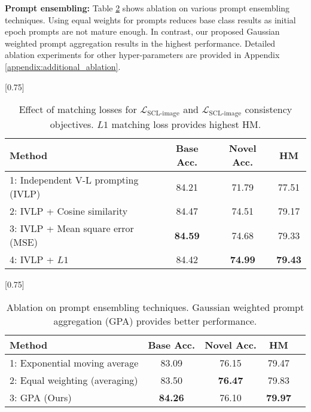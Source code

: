 \documentclass[10pt,twocolumn,letterpaper]{article}
\begin{document}
\noindent \textbf{Prompt ensembling:}
Table \ref{tab:ablations_on_ensembling} shows ablation on various prompt ensembling techniques. Using equal weights for prompts reduces base class results as initial epoch prompts are not mature enough. In contrast, our proposed Gaussian weighted prompt aggregation results in the highest performance. Detailed ablation experiments for other hyper-parameters are provided in Appendix \ref{appendix:additional_ablation}.
\begin{table}[t!]
    \small \centering
 \setlength{\tabcolsep}{7pt}
    \scalebox{0.75}[0.75]{
    \begin{tabular}{lccc}
    \toprule
    Method  & Base Acc. & Novel Acc. & HM \\
    \midrule
    1: Independent V-L prompting (IVLP) & 84.21 & 71.79 & 77.51 \\
    2: IVLP + Cosine similarity & 84.47	&74.51	&79.17 \\
    3: IVLP + Mean square error (MSE)  & \textbf{84.59}&	74.68 &	79.33 \\
     \rowcolor{tabhighlight} 4: IVLP + $L1$  & 84.42 & \textbf{74.99} & \textbf{79.43} \\
    \bottomrule
    \end{tabular}}
    \caption{Effect of matching losses for $\mathcal{L}_\text{SCL-image}$ and $\mathcal{L}_\text{SCL-image}$ consistency objectives. $L1$ matching loss provides highest HM.}
    \label{table:matching_loss_ablations}
\end{table} \begin{table}[t!]
   \small \centering
  \setlength{\tabcolsep}{10pt}
    \scalebox{0.75}[0.75]{
    \begin{tabular}{l cccc}
    \toprule
    Method  & Base Acc. & Novel Acc. & HM\\
            \midrule
    1: Exponential moving average & 83.09	&76.15 &	79.47 \\
    2: Equal weighting (averaging) & 83.50	&\textbf{76.47}	&79.83 \\
    \rowcolor{tabhighlight} 3:  GPA (Ours) & \textbf{84.26} & {76.10} & \textbf{79.97} \\
    \bottomrule
    \end{tabular}
    }\vspace{-0.5em}
    \caption{Ablation on prompt ensembling techniques. Gaussian weighted prompt aggregation (GPA) provides better performance. 
    }
    \label{tab:ablations_on_ensembling}
\end{table} 
\end{document}

